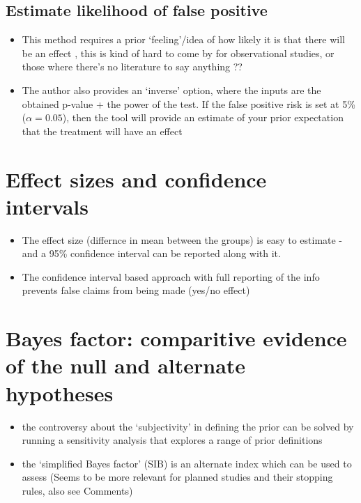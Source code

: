 \documentclass[
]{book}
\providecommand{\tightlist}{%
  \setlength{\itemsep}{0pt}\setlength{\parskip}{0pt}}
\begin{document}
\hypertarget{estimate-likelihood-of-false-positive}{%
\subsection{Estimate likelihood of false positive}\label{estimate-likelihood-of-false-positive}}

\begin{itemize}
\tightlist
\item
  This method requires a prior `feeling'/idea of how likely it is that there will be an effect , this is kind of hard to come by for observational studies, or those where there's no literature to say anything ??
\item
  The author also provides an `inverse' option, where the inputs are the obtained p-value + the power of the test. If the false positive risk is set at 5\% (\(\alpha=0.05\)), then the tool will provide an estimate of your prior expectation that the treatment will have an effect
\end{itemize}

\hypertarget{effect-sizes-and-confidence-intervals}{%
\section{Effect sizes and confidence intervals}\label{effect-sizes-and-confidence-intervals}}

\begin{itemize}
\tightlist
\item
  The effect size (differnce in mean between the groups) is easy to estimate - and a 95\% confidence interval can be reported along with it.
\item
  The confidence interval based approach with full reporting of the info prevents false claims from being made (yes/no effect)
\end{itemize}

\hypertarget{bayes-factor-comparitive-evidence-of-the-null-and-alternate-hypotheses}{%
\section{Bayes factor: comparitive evidence of the null and alternate hypotheses}\label{bayes-factor-comparitive-evidence-of-the-null-and-alternate-hypotheses}}

\begin{itemize}
\tightlist
\item
  the controversy about the `subjectivity' in defining the prior can be solved by running a sensitivity analysis that explores a range of prior definitions
\item
  the `simplified Bayes factor' (SIB) is an alternate index which can be used to assess (Seems to be more relevant for planned studies and their stopping rules, also see Comments)
\end{itemize}
\end{document}
